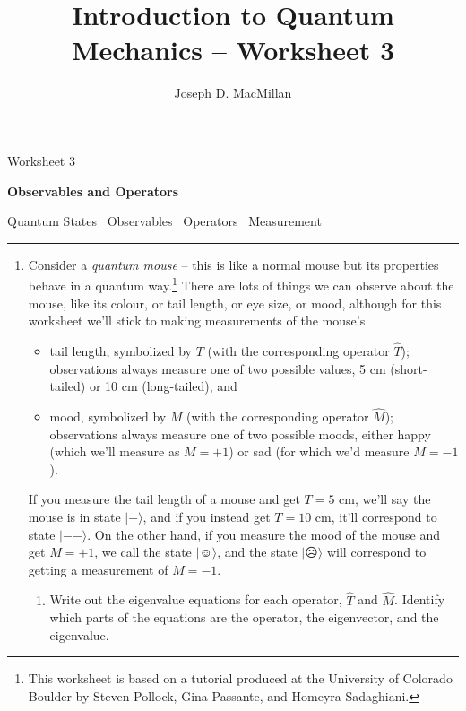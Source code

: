 \documentclass[10pt, letterpaper, twoside, openany]{article}
\title{Introduction to Quantum Mechanics -- Worksheet 3}
\author{Joseph D. MacMillan}
\date{}
\newcommand{\ket}[1]{| #1 \rangle}
\begin{document}
\pagestyle{fancy}

\Large \noindent Worksheet 3

\noindent \LARGE \textbf{Observables and Operators}

\normalsize

\vspace{0.2in}

\noindent Quantum States  \bullet \  Observables   \bullet \  Operators \bullet \ Measurement  

\vspace{0.1in}

\noindent \rule{\textwidth}{0.5pt}

\vspace{0.2in}

\begin{enumerate}
\item Consider a \emph{quantum mouse} -- this is like a normal mouse but its properties behave in a quantum way.\footnote{This worksheet is based on a tutorial produced at the University of Colorado Boulder by Steven Pollock, Gina Passante, and Homeyra Sadaghiani.}   There are lots of things we can observe about the mouse, like its colour, or tail length, or eye size, or mood, although for this worksheet we'll stick to making measurements of the mouse's
\begin{itemize}
\item tail length, symbolized by $T$ (with the corresponding operator $\hat{T}$); observations always measure one of two possible values, 5 cm (short-tailed) or 10 cm (long-tailed), and
\item mood, symbolized by $M$ (with the corresponding operator $\hat{M}$); observations always measure one of two possible moods, either happy (which we'll measure as $M = +1$) or sad (for which we'd measure $M = -1$).
\end{itemize}
If you measure the tail length of a mouse and get $T = 5$ cm, we'll say the mouse is in state $\ket{-}$, and if you instead get $T = 10$ cm, it'll correspond to state $\ket{--}$.  On the other hand, if you measure the mood of the mouse and get $M = +1$, we call the state $\ket{☺}$, and the state $\ket{☹}$ will correspond to getting a measurement of $M = -1$.

\begin{enumerate}
\item Write out the eigenvalue equations for each operator, $\hat{T}$ and $\hat{M}$.  Identify which parts of the equations are the operator, the eigenvector, and the eigenvalue.


\end{enumerate}
\end{enumerate}
\end{document}

